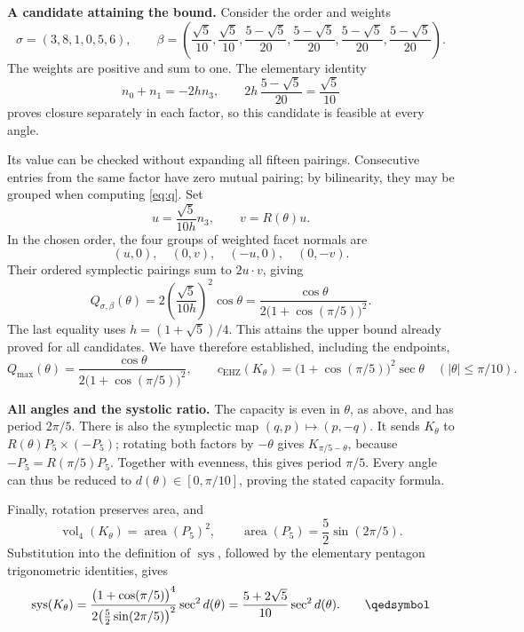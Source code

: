 \documentclass[11pt,a4paper]{article}
\newcommand{\capEHZ}{c_{\mathrm{EHZ}}}
\newcommand{\sys}{\operatorname{sys}}
\begin{document}
\newpage
\textbf{A candidate attaining the bound.}
Consider the order and weights
\[
 \sigma=(3,8,1,0,5,6),\qquad
 \beta=\left(\frac{\sqrt5}{10},\frac{\sqrt5}{10},
 \frac{5-\sqrt5}{20},\frac{5-\sqrt5}{20},
 \frac{5-\sqrt5}{20},\frac{5-\sqrt5}{20}\right).
\]
The weights are positive and sum to one. The elementary identity
\[
 n_0+n_1=-2h n_3,
 \qquad
 2h\,\frac{5-\sqrt5}{20}=\frac{\sqrt5}{10}
\]
proves closure separately in each factor, so this candidate is feasible
at every angle.

Its value can be checked without expanding all fifteen pairings.
Consecutive entries from the same factor have zero mutual pairing;
by bilinearity, they may be grouped when computing \eqref{eq:q}.
Set
\[
 u=\frac{\sqrt5}{10h}n_3,\qquad v=R(\theta)u.
\]
In the chosen order, the four groups of weighted facet normals are
\[
 (u,0),\quad(0,v),\quad(-u,0),\quad(0,-v).
\]
Their ordered symplectic pairings sum to $2u\cdot v$, giving
\[
 Q_{\sigma,\beta}(\theta)
 =2\left(\frac{\sqrt5}{10h}\right)^2\cos\theta
 =\frac{\cos\theta}{2\bigl(1+\cos(\pi/5)\bigr)^2}.
\]
The last equality uses $h=(1+\sqrt5)/4$.
This attains the upper bound already proved for all candidates. We have
therefore established, including the endpoints,
\[
 Q_{\max}(\theta)
 =\frac{\cos\theta}{2\bigl(1+\cos(\pi/5)\bigr)^2},
 \qquad
 \capEHZ(K_\theta)=\bigl(1+\cos(\pi/5)\bigr)^2\sec\theta
 \quad (|\theta|\le\pi/10).
\]

\textbf{All angles and the systolic ratio.}
The capacity is even in $\theta$, as above, and has period $2\pi/5$.
There is also the symplectic map $(q,p)\mapsto(p,-q)$. It sends $K_\theta$
to $R(\theta)P_5\times(-P_5)$; rotating both factors by $-\theta$ gives
$K_{\pi/5-\theta}$, because $-P_5=R(\pi/5)P_5$.
Together with evenness, this gives period $\pi/5$. Every angle can thus
be reduced to $d(\theta)\in[0,\pi/10]$, proving the stated capacity formula.

Finally, rotation preserves area, and
\[
 \operatorname{vol}_4(K_\theta)=\operatorname{area}(P_5)^2,
 \qquad \operatorname{area}(P_5)=\frac52\sin(2\pi/5).
\]
Substitution into the definition of $\sys$, followed by the elementary
pentagon trigonometric identities, gives
\[
 \sys(K_\theta)
 =\frac{\bigl(1+\cos(\pi/5)\bigr)^4}
 {2\bigl(\frac52\sin(2\pi/5)\bigr)^2}\sec^2 d(\theta)
 =\frac{5+2\sqrt5}{10}\sec^2 d(\theta).
 \qquad\qedsymbol
\]
\end{document}
